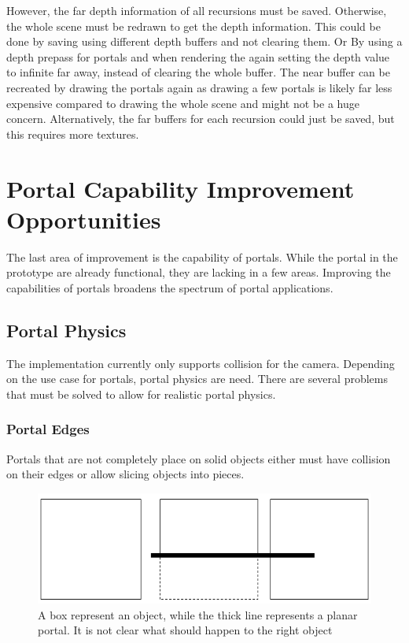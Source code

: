 However, the far depth information of all recursions must be saved. Otherwise, the whole scene must be redrawn to get the depth information. This could be done by saving using different depth buffers and not clearing them. Or By using a depth prepass for portals and when rendering the again setting the depth value to infinite far away, instead of clearing the whole buffer. The near buffer can be recreated by drawing the portals again as drawing a few portals is likely far less expensive compared to drawing the whole scene and might not be a huge concern. Alternatively, the far buffers for each recursion could just be saved, but this requires more textures.


\chapter{Portal Capability Improvement Opportunities}
The last area of improvement is the capability of portals. While the portal in the prototype are already functional, they are lacking in a few areas. Improving the capabilities of portals broadens the spectrum of portal applications. 


\section{Portal Physics}
\label{section:portalphysics}
The implementation currently only supports collision for the camera. Depending on the use case for portals, portal physics are need. There are several problems that must be solved to allow for realistic portal physics.

\subsection{Portal Edges}
Portals that are not completely place on solid objects either must have collision on their edges or allow slicing objects into pieces.

\begin{figure}[h]
	\centering
	\includegraphics[width=\linewidth]{images/edgecollision.png}
	\caption{A box represent an object, while the thick line represents a planar portal. It is not clear what should happen to the right object}
	\label{fig:edgecollision}
\end{figure}

